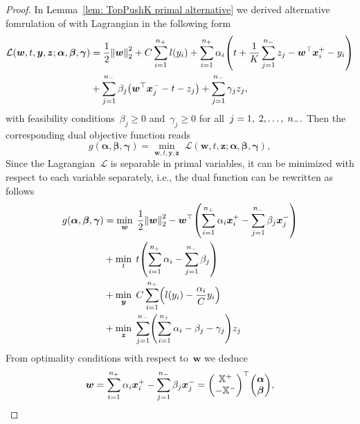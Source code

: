 \begin{proof}
  In Lemma~\ref{lem: TopPushK primal alternative} we derived alternative fomrulation of \TopPushK with Lagrangian in the following form
  \begin{align*}
    \mathcal{L}(\bm{w}, t, \bm{y}, \bm{z}; \bm{\alpha}, \bm{\beta}, \bm{\gamma})
     & = \frac{1}{2} \norm{\bm{w}}_{2}^{2}
       + C \sum_{i = 1}^{\npos} l(y_i)
       + \sum_{i = 1}^{\npos} \alpha_i \Brac{t + \frac{1}{K} \sum_{j = 1}^{\nneg} z_j - \bm{w}^\top \bm{x}^+_i - y_i} \\
     & + \sum_{j = 1}^{\nneg} \beta_j \Brac{\bm{w}^\top \bm{x}^-_j - t - z_j}
       + \sum_{j = 1}^{\nneg} \gamma_j z_j,
  \end{align*}
  with feasibility conditions~$\beta_j \geq 0$ and~$\gamma_j \geq 0$ for all~$j = 1, \; 2, \ldots, \; n_{-}.$ Then the corresponding dual objective function reads
  \begin{equation*}
    g(\bm{\alpha}, \bm{\beta}, \bm{\gamma})
      = \min_{\bm{w}, t, \bm{y}, \bm{z}} \; \mathcal{L}(\bm{w}, t, \bm{z}; \bm{\alpha}, \bm{\beta}, \bm{\gamma}),
  \end{equation*}
  Since the Lagrangian~$\mathcal{L}$ is separable in primal variables, it can be minimized with respect to each variable separately, i.e., the dual function can be rewritten as follows
  \begin{equation}\label{eq: TopPushK dual function}
    \begin{aligned}
      g(\bm{\alpha}, \bm{\beta}, \bm{\gamma})
        & = \min_{\bm{w}} \; \frac{1}{2} \norm{\bm{w}}_{2}^{2}
          - \bm{w}^{\top} \Brac{\sum_{i = 1}^{\npos} \alpha_i \bm{x}^+_i - \sum_{j = 1}^{\nneg} \beta_j \bm{x}^-_j} \\
        & + \min_{t} \; t \Brac{\sum_{i = 1}^{\npos} \alpha_i - \sum_{j = 1}^{\nneg} \beta_j} \\
        & + \min_{\bm{y}} \; C \sum_{i = 1}^{\npos} \Brac{l(y_i) - \frac{\alpha_i}{C}y_i} \\
        & + \min_{\bm{z}} \; \sum_{j = 1}^{\nneg} \Brac{\sum_{i = 1}^{\npos} \alpha_i - \beta_j - \gamma_j}z_j
    \end{aligned}
  \end{equation}
  From optimality conditions with respect to~$\bm{w}$ we deduce 
  \begin{equation*}
    \bm{w}
        = \sum_{i = 1}^{\npos} \alpha_i \bm{x}^+_i - \sum_{j = 1}^{\nneg} \beta_j \bm{x}^-_j
        = \Matrix{\X^+ \\ - \X^-}^\top \vecab,

\end{equation*}
\end{proof}
